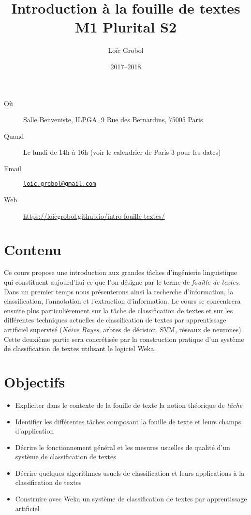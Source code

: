 \documentclass[a4paper, 11pt]{article}
\title{Introduction à la fouille de textes\\M1 Plurital S2}
\author{Loïc Grobol}
\date{2017–2018}
\begin{document}
\vspace*{-7em}
{\let\newpage\relax\maketitle}
\thispagestyle{main}

\begin{description}
    \item[Où] Salle Benveniste, ILPGA, 9 Rue des Bernardins, 75005 Paris
    \item[Quand] Le lundi de 14h à 16h (voir le calendrier de Paris 3 pour les dates)
    \item[Email] \href{mailto:loic.grobol@gmail.com}{\texttt{loic.grobol@gmail.com}}
    \item[Web] \url{https://loicgrobol.github.io/intro-fouille-textes/}
\end{description}

\section*{Contenu}
Ce cours propose une introduction aux grandes tâches d'ingénierie linguistique qui constituent aujourd'hui ce que l'on désigne par le terme de \emph{fouille de textes}.
Dans un premier temps nous présenterons ainsi la recherche d'information, la classification, l'annotation et l'extraction d'information.
Le  cours se  concentrera ensuite plus particulièrement sur la tâche de classification de textes et sur les différentes techniques actuelles de classification de textes par apprentissage artificiel supervisé (\emph{Naive Bayes}, arbres de décision, SVM, réseaux de neurones).
Cette deuxième partie sera concrétisée par la construction pratique d'un système de classification de textes utilisant le logiciel Weka.

\section*{Objectifs}

\begin{itemize}
    \item Expliciter dans le contexte de la fouille de texte la notion théorique de \emph{tâche}
    \item Identifier les différentes tâches composant la fouille de texte et leurs champs d'application
    \item Décrire le fonctionnement général et les mesures usuelles de qualité d'un système de classification de textes
    \item Décrire quelques algorithmes usuels de classification et leurs applications à la classification de textes
    \item Construire avec Weka un système de classification de textes par apprentissage artificiel
\end{itemize}
\end{document}
